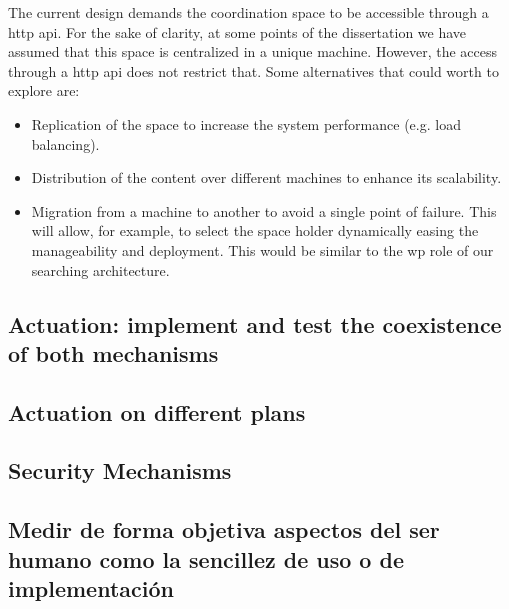The current design demands the coordination space to be accessible through a \ac{http} \ac{api}.
For the sake of clarity, at some points of the dissertation we have assumed that this space is centralized in a unique machine.
However, the access through a \ac{http} \ac{api} does not restrict that.
Some alternatives that could worth to explore are: %
\begin{itemize}
  \item Replication of the space to increase the system performance (e.g. load balancing).
  \item Distribution of the content over different machines to enhance its scalability. %
  \item Migration from a machine to another to avoid a single point of failure.
        This will allow, for example, to select the space holder dynamically easing the manageability and deployment.
        This would be similar to the \ac{wp} role of our searching architecture. %
\end{itemize}


\subsection{Actuation: implement and test the coexistence of both mechanisms}

\subsection{Actuation on different plans}


\subsection{Security Mechanisms}





\subsection{Medir de forma objetiva aspectos del ser humano como la sencillez de uso o de implementación}


